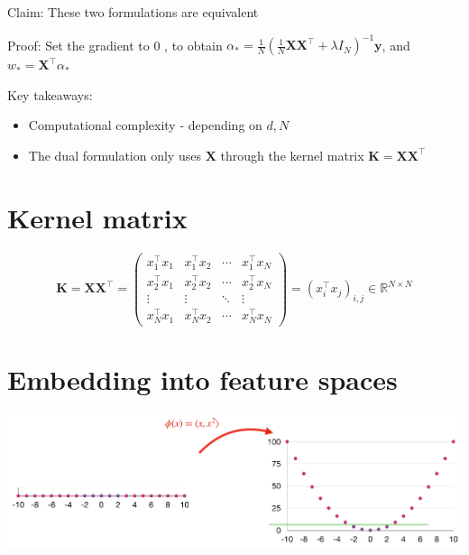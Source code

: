 \documentclass[10pt]{article}
\begin{document}
Claim: These two formulations are equivalent

Proof: Set the gradient to 0 , to obtain $\alpha_{*}=\frac{1}{N}\left(\frac{1}{N} \mathbf{X} \mathbf{X}^{\top}+\lambda I_{N}\right)^{-1} \mathbf{y}$, and $w_{*}=\mathbf{X}^{\top} \alpha_{*}$

Key takeaways:

\begin{itemize}
  \item Computational complexity - depending on $d, N$
  \item The dual formulation only uses $\mathbf{X}$ through the kernel matrix $\mathbf{K}=\mathbf{X X}^{\top}$
\end{itemize}

\section*{Kernel matrix}
$$
\mathbf{K}=\mathbf{X} \mathbf{X}^{\top}=\left(\begin{array}{cccc}
x_{1}^{\top} x_{1} & x_{1}^{\top} x_{2} & \cdots & x_{1}^{\top} x_{N} \\
x_{2}^{\top} x_{1} & x_{2}^{\top} x_{2} & \cdots & x_{2}^{\top} x_{N} \\
\vdots & \vdots & \ddots & \vdots \\
x_{N}^{\top} x_{1} & x_{N}^{\top} x_{2} & \cdots & x_{N}^{\top} x_{N}
\end{array}\right)=\left(x_{i}^{\top} x_{j}\right)_{i, j} \in \mathbb{R}^{N \times N}
$$

\section*{Embedding into feature spaces}
\begin{center}
\includegraphics[max width=\textwidth]{2023_12_30_94b0d65233167cf65e4cg-09}
\end{center}
\end{document}
